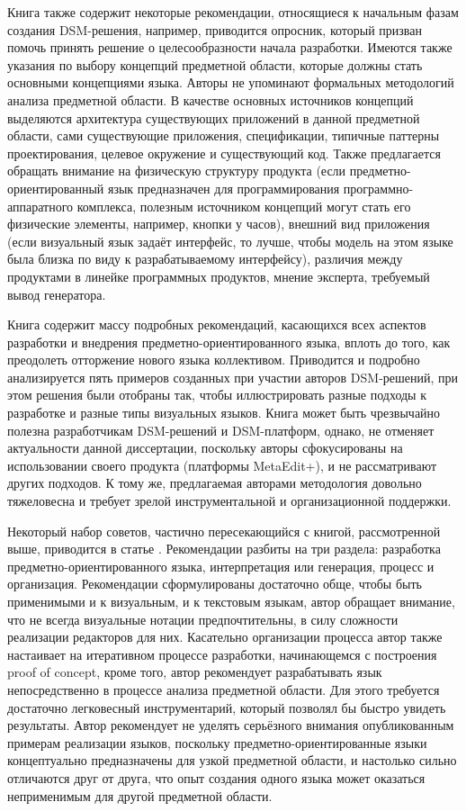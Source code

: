 Книга также содержит некоторые рекомендации, относящиеся к начальным фазам создания 
DSM-решения, например, приводится опросник, который призван помочь принять решение о 
целесообразности начала разработки. Имеются также указания по выбору концепций предметной 
области, которые должны стать основными концепциями языка. Авторы не упоминают формальных 
методологий анализа предметной области. В качестве основных источников концепций выделяются 
архитектура существующих приложений в данной предметной области, сами существующие приложения, 
спецификации, типичные паттерны проектирования, целевое окружение и существующий код.
 Также предлагается обращать внимание на физическую структуру продукта (если предметно-ориентированный 
язык предназначен для программирования программно-аппаратного комплекса, полезным 
источником концепций могут стать его физические элементы, например, кнопки у часов), 
внешний вид приложения (если визуальный язык задаёт интерфейс, то лучше, чтобы модель 
на этом языке была близка по виду к разрабатываемому интерфейсу), различия между продуктами 
в линейке программных продуктов, мнение эксперта, требуемый вывод генератора.

Книга содержит массу подробных рекомендаций, касающихся всех аспектов разработки и 
внедрения предметно-ориентированного языка, вплоть до того, как преодолеть отторжение 
нового языка коллективом. Приводится и подробно анализируется пять примеров созданных 
при участии авторов DSM-решений, при этом решения были отобраны так, чтобы иллюстрировать 
разные подходы к разработке и разные типы визуальных языков. Книга может быть чрезвычайно 
полезна разработчикам DSM-решений и DSM-платформ, однако, не отменяет актуальности 
данной диссертации, поскольку авторы сфокусированы на использовании своего продукта 
(платформы MetaEdit+), и не рассматривают других подходов. К тому же, предлагаемая 
авторами методология довольно тяжеловесна и требует зрелой инструментальной и организационной 
поддержки.

Некоторый набор советов, частично пересекающийся с книгой, рассмотренной выше, приводится 
в статье \cite{voelter2009best}. Рекомендации разбиты на три раздела: разработка предметно-ориентированного 
языка, интерпретация или генерация, процесс и организация. Рекомендации сформулированы 
достаточно обще, чтобы быть применимыми и к визуальным, и к текстовым языкам, автор 
обращает внимание, что не всегда визуальные нотации предпочтительны, в силу сложности 
реализации редакторов для них. Касательно организации процесса автор также настаивает 
на итеративном процессе разработки, начинающемся с построения proof of concept, кроме 
того, автор рекомендует разрабатывать язык непосредственно в процессе анализа предметной 
области. Для этого требуется достаточно легковесный инструментарий, который позволял 
бы быстро увидеть результаты. Автор рекомендует не уделять серьёзного внимания опубликованным 
примерам реализации языков, поскольку предметно-ориентированные языки концептуально 
предназначены для узкой предметной области, и настолько сильно отличаются друг от друга, 
что опыт создания одного языка может оказаться неприменимым для другой предметной области.

